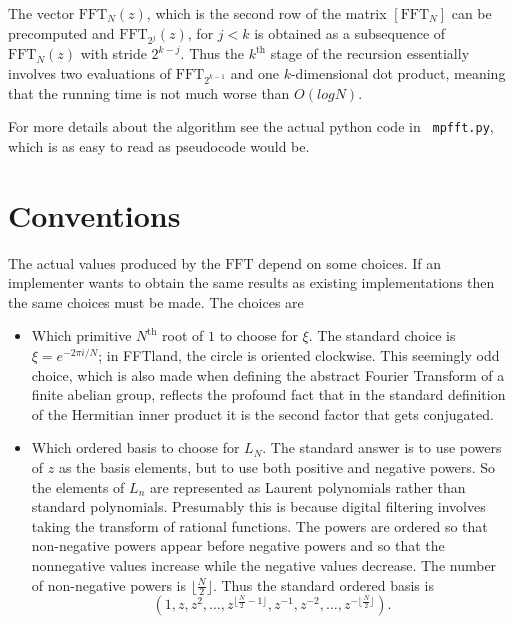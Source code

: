 \documentclass[12pt, letter, oneside]{amsart}
\theoremstyle{definition}
\theoremstyle{plain}
\numberwithin{equation}{para}
\numberwithin{figure}{section}
\newcommand{\FFT}{\text{FFT}}
\renewcommand{\th}{\text{th}}
\begin{document}
The vector $\FFT_N(z)$, which is the second row of the matrix $[\FFT_N]$ can
be precomputed and $\FFT_{2^j}(z)$, for $j < k$ is obtained as a subsequence
of $\FFT_N(z)$ with stride $2^{k-j}$.  Thus the $k^\th$ stage of the recursion
essentially involves two evaluations of $\FFT_{2^{k-1}}$ and one $k$-dimensional
dot product, meaning that the running time is not much worse than $O(log N)$.

For more details about the algorithm see the actual python code in {\tt
  mpfft.py}, which is as easy to read as pseudocode would be.

\section{Conventions}

The actual values produced by the $\FFT$ depend on some choices.  If an
implementer wants to obtain the same results as existing implementations
then the same choices must be made.  The choices are
\begin{itemize}
\setlength\itemsep{1em}

\item Which primitive $N^\th$ root of $1$ to choose for $\xi$.  The standard
choice is $\xi = e^{-2\pi i/N}$; in FFTland, the circle is oriented clockwise.
This seemingly odd choice, which is also made when defining the abstract Fourier
Transform of a finite abelian group, reflects the profound fact that in the
standard definition of the Hermitian inner product it is the second factor that
gets conjugated.

\item Which ordered basis to choose for $L_N$.  The standard answer is to use
powers of $z$ as the basis elements, but to use both positive and negative
powers.  So the elements of $L_n$ are represented as Laurent polynomials
rather than standard polynomials.  Presumably this is because digital filtering
involves taking the transform of rational functions.  The powers are ordered
so that non-negative powers appear before negative powers and so that the
nonnegative values increase while the negative values decrease. The number
of non-negative powers is $\lfloor \frac{N}{2}\rfloor$.  Thus the standard ordered
basis is
$$(1, z, z^2, \ldots, z^{\lfloor \frac{N}{2} - 1\rfloor}, z^{-1}, z^{-2},
\ldots, z^{-\lfloor \frac{N}{2}\rfloor}).$$
\end{itemize}
\end{document}
